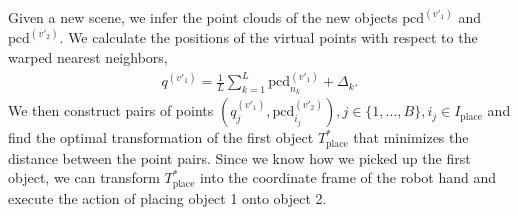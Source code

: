 \documentclass{article}
\newcommand{\pcx}[1]{\mathrm{pcd}^{(#1)}}
\begin{document}
Given a new scene, we infer the point clouds of the new objects $\pcx{v'_1}$ and $\pcx{v'_2}$. We calculate the positions of the virtual points with respect to the warped nearest neighbors,
\begin{align}
    q^{(v'_1)} = \frac{1}{L} \sum_{k=1}^L \pcx{v'_1}_{n_k} + \Delta_k.
\end{align}
We then construct pairs of points $(q^{(v'_1)}_j, \pcx{v'_2}_{i_j}), j \in \{1, ..., B\}, i_j \in I_{\mathrm{place}}$ and find the optimal transformation of the first object $T^*_{\mathrm{place}}$ that minimizes the distance between the point pairs. Since we know how we picked up the first object, we can transform $T^*_{\mathrm{place}}$ into the coordinate frame of the robot hand and execute the action of placing object 1 onto object 2.





\end{document}
